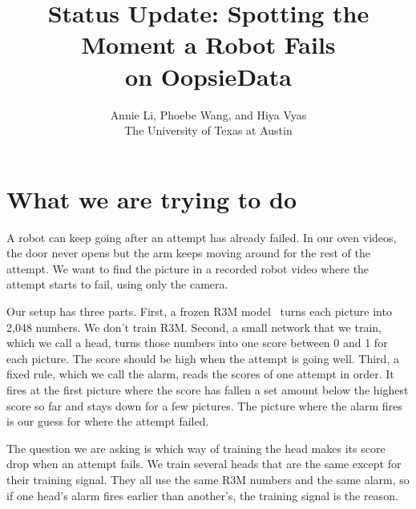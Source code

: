 \documentclass{article}
\title{Status Update: Spotting the Moment a Robot Fails\\ on OopsieData}
\author{%
  Annie Li, Phoebe Wang, and Hiya Vyas\\
  The University of Texas at Austin
}
\begin{document}
\maketitle

\section{What we are trying to do}\label{sec:goal}
A robot can keep going after an attempt has already failed. In our oven videos, the door never opens but the arm keeps moving around for the rest of the attempt. We want to find the picture in a recorded robot video where the attempt starts to fail, using only the camera.

Our setup has three parts. First, a frozen R3M model~\citep{r3m} turns each picture into 2{,}048 numbers. We don't train R3M. Second, a small network that we train, which we call a head, turns those numbers into one score between 0 and 1 for each picture. The score should be high when the attempt is going well. Third, a fixed rule, which we call the alarm, reads the scores of one attempt in order. It fires at the first picture where the score has fallen a set amount below the highest score so far and stays down for a few pictures. The picture where the alarm fires is our guess for where the attempt failed.

The question we are asking is which way of training the head makes its score drop when an attempt fails. We train several heads that are the same except for their training signal. They all use the same R3M numbers and the same alarm, so if one head's alarm fires earlier than another's, the training signal is the reason.
\end{document}
